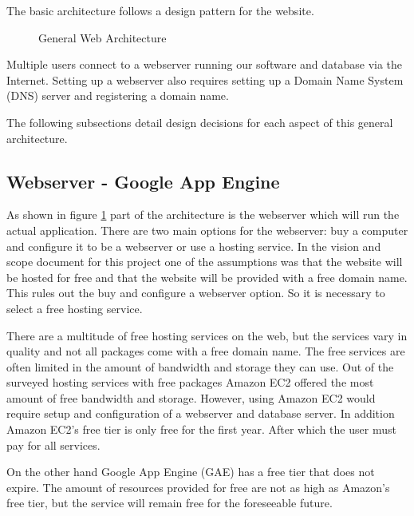 \documentclass{article}
\begin{document}
The basic architecture follows a design pattern for the website.

\FloatBarrier
\begin{figure}[h!]
\caption{General Web Architecture}
\label{fig:generalWebArchitecture}
\end{figure}
\FloatBarrier

Multiple users connect to a webserver running our software and database via the Internet.
Setting up a webserver also requires setting up a Domain Name System (DNS) server and registering a domain
name.

The following subsections detail design decisions for each aspect of this general architecture.

\subsection{Webserver - Google App Engine}

As shown in figure \ref{fig:generalWebArchitecture} part of the architecture is the webserver which will run the actual application. There are two main options
for the webserver: buy a computer and configure it to be a webserver or use a hosting service. In the vision and scope document for this project
one of the assumptions was that the website will be hosted for free and that the website will be provided with a free
domain name. \cite{schwab_apo_2012} This rules out the buy and configure a webserver option. So it is necessary to select a free hosting service.

There are a multitude of free hosting services on the web, but the services vary in quality and not all packages
come with a free domain name. The free services are often limited in the amount of bandwidth and storage they can use.
Out of the surveyed hosting services with free packages Amazon EC2 offered the most amount of free bandwidth and storage. \cite{amazon_amazon_2012} \cite{heroku_heroku_2012} \cite{google_quotas_2012} However, using Amazon EC2 would require setup and configuration of a webserver and database server. In addition Amazon EC2's free tier is only free for the first year. After which the user must pay for all services.

On the other hand Google App Engine (GAE) has a free tier that does not expire. The amount of resources provided for free are not as high as Amazon's free tier, but the service will remain free for the foreseeable future.  \cite{google_quotas_2012} 
\end{document}
